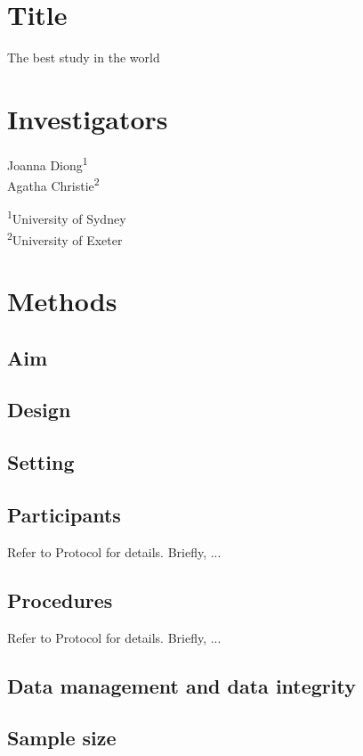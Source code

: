 \documentclass[11pt,a4paper]{article}
\begin{document}
\setcounter{page}{1}

\section*{Title}
The best study in the world

\section*{Investigators}
Joanna Diong\textsuperscript{1} \\
Agatha Christie\textsuperscript{2} 

\textsuperscript{1}University of Sydney \\
\textsuperscript{2}University of Exeter

\section*{Methods}

\subsection*{Aim}

\subsection*{Design}

\subsection*{Setting}

\subsection*{Participants}
Refer to Protocol for details. Briefly, ... 

\subsection*{Procedures}
Refer to Protocol for details. Briefly, ... \citep{Pascoe2014}

\subsection*{Data management and data integrity}

\subsection*{Sample size}
\end{document}
